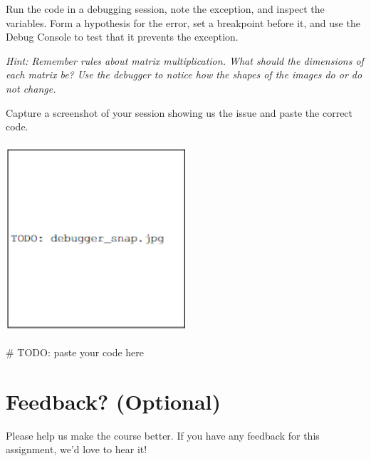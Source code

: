 \documentclass[11pt]{article}
\begin{document}
\begin{tcolorbox}[colback=orange!5!white,colframe=orange!75!black]
Run the code in a debugging session, note the exception, and inspect the variables. Form a hypothesis for the error, set a breakpoint before it, and use the Debug Console to test that it prevents the exception. 
\end{tcolorbox}

\emph{Hint: Remember rules about matrix multiplication. What should the dimensions of each matrix be? Use the debugger to notice how the shapes of the images do or do not change.}

Capture a screenshot of your session showing us the issue and paste the correct code.

\begin{tcolorbox}[colback=white!5!white,colframe=green!75!black,breakable,height=8cm,enhanced jigsaw,pad at break*=1mm]
    \includegraphics[width=0.5\textwidth,height=7cm,keepaspectratio]{images/TODO_debugger_snap.jpg}
    
\end{tcolorbox}

\pagebreak
\begin{tcolorbox}[colback=white!5!white,colframe=green!75!black,breakable,height=15cm,enhanced jigsaw,pad at break*=1mm]
    \begin{python}
    # TODO: paste your code here
    
    \end{python}
\end{tcolorbox}


\pagebreak
\section*{Feedback? (Optional)}
Please help us make the course better. If you have any feedback for this assignment, we'd love to hear it!
\end{document}
